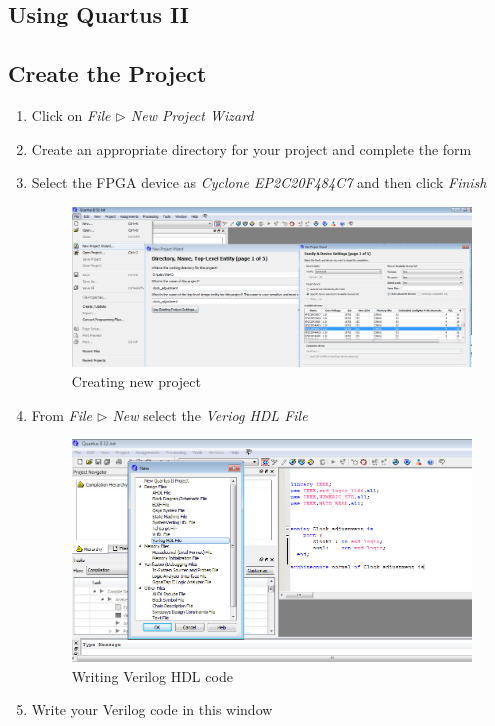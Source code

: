 \documentclass[12pt, logo=tehranDLDL/ut]{tehranDLDL}
\begin{document}
\begin{appendices}
\section{Using Quartus II}

\subsection{Create the Project}

\begin{enumerate}
    \item Click on \textit{File $\rhd$ New Project Wizard}
    \item Create an appropriate directory for your project and complete the form
    \item Select the FPGA device as \textit{Cyclone EP2C20F484C7} and then click \textit{Finish}
    \begin{figure}[!b]
        \centering
        \caption{Creating new project\label{fig:new_proj}}
        \includegraphics[width=\textwidth]{new_proj.png}
    \end{figure}
    \item From \textit{File $\rhd$ New} select the \textit{Veriog HDL File}
    \begin{figure}
        \centering
        \caption{Writing Verilog HDL code\label{fig:verilog}}
        \includegraphics[width=\textwidth]{verilog.png}
    \end{figure}
    \item Write your Verilog code in this window
\end{enumerate}


\end{appendices}
\end{document}
